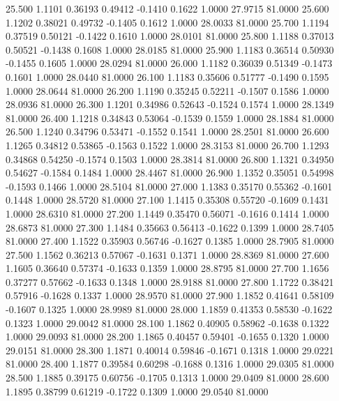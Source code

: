   25.500   1.1101   0.36193   0.49412  -0.1410   0.1622   1.0000  27.9715  81.0000
  25.600   1.1202   0.38021   0.49732  -0.1405   0.1612   1.0000  28.0033  81.0000
  25.700   1.1194   0.37519   0.50121  -0.1422   0.1610   1.0000  28.0101  81.0000
  25.800   1.1188   0.37013   0.50521  -0.1438   0.1608   1.0000  28.0185  81.0000
  25.900   1.1183   0.36514   0.50930  -0.1455   0.1605   1.0000  28.0294  81.0000
  26.000   1.1182   0.36039   0.51349  -0.1473   0.1601   1.0000  28.0440  81.0000
  26.100   1.1183   0.35606   0.51777  -0.1490   0.1595   1.0000  28.0644  81.0000
  26.200   1.1190   0.35245   0.52211  -0.1507   0.1586   1.0000  28.0936  81.0000
  26.300   1.1201   0.34986   0.52643  -0.1524   0.1574   1.0000  28.1349  81.0000
  26.400   1.1218   0.34843   0.53064  -0.1539   0.1559   1.0000  28.1884  81.0000
  26.500   1.1240   0.34796   0.53471  -0.1552   0.1541   1.0000  28.2501  81.0000
  26.600   1.1265   0.34812   0.53865  -0.1563   0.1522   1.0000  28.3153  81.0000
  26.700   1.1293   0.34868   0.54250  -0.1574   0.1503   1.0000  28.3814  81.0000
  26.800   1.1321   0.34950   0.54627  -0.1584   0.1484   1.0000  28.4467  81.0000
  26.900   1.1352   0.35051   0.54998  -0.1593   0.1466   1.0000  28.5104  81.0000
  27.000   1.1383   0.35170   0.55362  -0.1601   0.1448   1.0000  28.5720  81.0000
  27.100   1.1415   0.35308   0.55720  -0.1609   0.1431   1.0000  28.6310  81.0000
  27.200   1.1449   0.35470   0.56071  -0.1616   0.1414   1.0000  28.6873  81.0000
  27.300   1.1484   0.35663   0.56413  -0.1622   0.1399   1.0000  28.7405  81.0000
  27.400   1.1522   0.35903   0.56746  -0.1627   0.1385   1.0000  28.7905  81.0000
  27.500   1.1562   0.36213   0.57067  -0.1631   0.1371   1.0000  28.8369  81.0000
  27.600   1.1605   0.36640   0.57374  -0.1633   0.1359   1.0000  28.8795  81.0000
  27.700   1.1656   0.37277   0.57662  -0.1633   0.1348   1.0000  28.9188  81.0000
  27.800   1.1722   0.38421   0.57916  -0.1628   0.1337   1.0000  28.9570  81.0000
  27.900   1.1852   0.41641   0.58109  -0.1607   0.1325   1.0000  28.9989  81.0000
  28.000   1.1859   0.41353   0.58530  -0.1622   0.1323   1.0000  29.0042  81.0000
  28.100   1.1862   0.40905   0.58962  -0.1638   0.1322   1.0000  29.0093  81.0000
  28.200   1.1865   0.40457   0.59401  -0.1655   0.1320   1.0000  29.0151  81.0000
  28.300   1.1871   0.40014   0.59846  -0.1671   0.1318   1.0000  29.0221  81.0000
  28.400   1.1877   0.39584   0.60298  -0.1688   0.1316   1.0000  29.0305  81.0000
  28.500   1.1885   0.39175   0.60756  -0.1705   0.1313   1.0000  29.0409  81.0000
  28.600   1.1895   0.38799   0.61219  -0.1722   0.1309   1.0000  29.0540  81.0000
